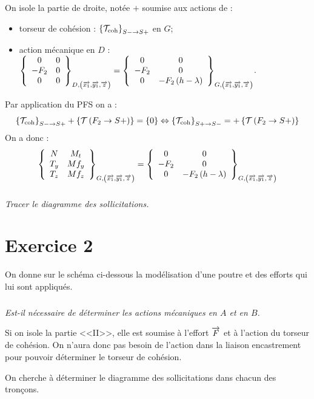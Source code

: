 \documentclass[10pt,fleqn]{article} %
\begin{document}
\begin{multicols}{1}
\begin{corrige}
On isole la partie de droite, notée $+$ soumise aux actions de :
\begin{itemize}[label=,font=\color{ocre}] 
\item torseur de cohésion : $\torseurscoh_{S-\rightarrow S+}$ en $G$;
\item action mécanique en $D$ : $\torseurcol{0}{-F_2}{0}{0}{0}{0}{D,\left( \vect{x_1},\vect{y_1},\vect{z} \right)}  =\torseurcol{0}{-F_2}{0}{0}{0}{-F_2\left(h-\lambda\right)}{G,\left( \vect{x_1},\vect{y_1},\vect{z} \right)} $.
\end{itemize}


Par application du PFS on a : 
$$ \torseurscoh_{S-\rightarrow S+} +\torseurstat{T}{F_2}{S+} = \{0\} \Leftrightarrow \torseurscoh_{S+\rightarrow S-} =+\torseurstat{T}{F_2}{S+}  $$
On a donc  :
$$
\torseurcol{N}{T_y}{T_z}{M_t}{Mf_y}{Mf_z}{G,\left( \vect{x_1},\vect{y_1},\vect{z} \right)} = 
\torseurcol{0}{-F_2}{0}{0}{0}{-F_2\left(h-\lambda\right)}{G,\left( \vect{x_1},\vect{y_1},\vect{z} \right)}
$$



\end{corrige}
\else 
\fi


\subparagraph{}
\textit{Tracer le diagramme des sollicitations.}



\section*{Exercice 2}
\setcounter{subparagraph}{0}
On donne sur le schéma ci-dessous la modélisation d'une poutre et des efforts qui lui sont appliqués.
\subparagraph{}
\textit{Est-il nécessaire de déterminer les actions mécaniques en $A$ et en $B$.}
\ifprof
\begin{corrige}
Si on isole la partie <<II>>, elle est soumise à l'effort $\vect{F}$ et à l'action du torseur de cohésion. On n'aura donc pas besoin de l'action dans la liaison encastrement pour pouvoir déterminer le torseur de cohésion. 
\end{corrige}
\else 
\fi


On cherche à déterminer le diagramme des sollicitations dans chacun des tronçons.


\end{multicols}
\end{document}
